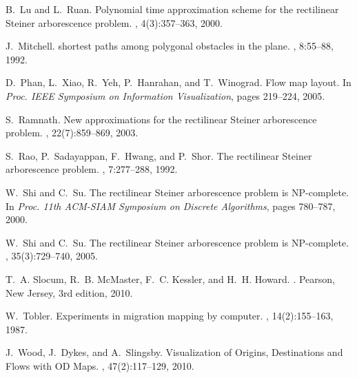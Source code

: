 \documentclass{journalA4}
\begin{document}
\begin{thebibliography}{21}
B.~Lu and L.~Ruan.
\newblock Polynomial time approximation scheme for the rectilinear {Steiner}
  arborescence problem.
, 4(3):357--363, 2000.

J.~Mitchell.
 shortest paths among polygonal obstacles in the plane.
, 8:55--88, 1992.

D.~Phan, L.~Xiao, R.~Yeh, P.~Hanrahan, and T.~Winograd.
\newblock Flow map layout.
\newblock In {\em Proc. IEEE Symposium on Information Visualization}, pages
  219--224, 2005.

S.~Ramnath.
\newblock New approximations for the rectilinear {Steiner} arborescence
  problem.
, 22(7):859--869, 2003.

S.~Rao, P.~Sadayappan, F.~Hwang, and P.~Shor.
\newblock The rectilinear {Steiner} arborescence problem.
, 7:277--288, 1992.

W.~Shi and C.~Su.
\newblock The rectilinear {Steiner} arborescence problem is {NP}-complete.
\newblock In {\em Proc. 11th ACM-SIAM Symposium on Discrete Algorithms}, pages
  780--787, 2000.

W.~Shi and C.~Su.
\newblock The rectilinear {Steiner} arborescence problem is {NP}-complete.
, 35(3):729--740, 2005.

T.~A. Slocum, R.~B. McMaster, F.~C. Kessler, and H.~H. Howard.
.
\newblock Pearson, New Jersey, 3rd edition, 2010.

W.~Tobler.
\newblock Experiments in migration mapping by computer.
, 14(2):155--163, 1987.

J.~Wood, J.~Dykes, and A.~Slingsby.
\newblock Visualization of Origins, Destinations and Flows with {OD} Maps.
, 47(2):117--129, 2010.

\end{thebibliography}
\end{document}

